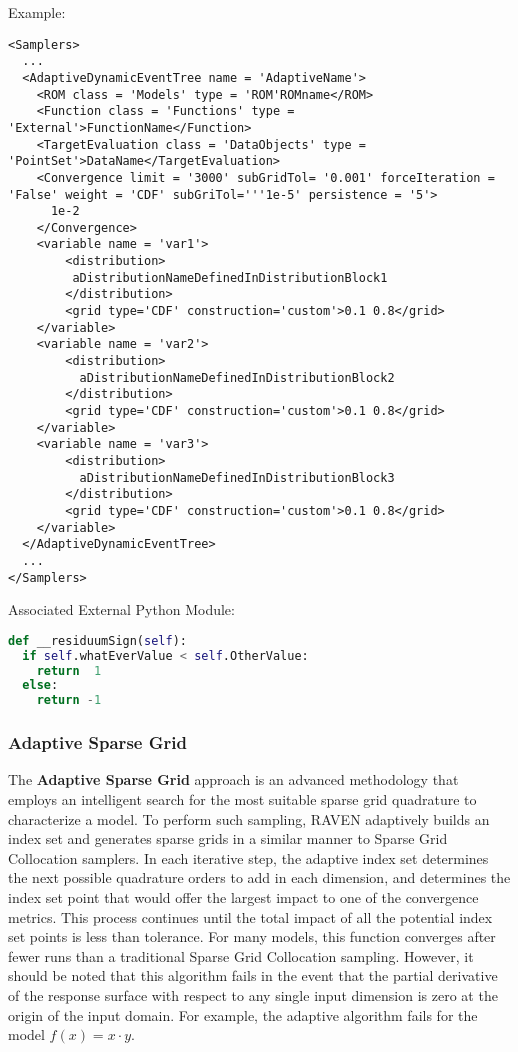 Example:
\begin{lstlisting}[style=XML]
<Samplers>
  ...
  <AdaptiveDynamicEventTree name = 'AdaptiveName'>
    <ROM class = 'Models' type = 'ROM'ROMname</ROM>
    <Function class = 'Functions' type = 'External'>FunctionName</Function>
    <TargetEvaluation class = 'DataObjects' type = 'PointSet'>DataName</TargetEvaluation>
    <Convergence limit = '3000' subGridTol= '0.001' forceIteration = 'False' weight = 'CDF' subGriTol='''1e-5' persistence = '5'>
      1e-2
    </Convergence>
    <variable name = 'var1'>
        <distribution>
         aDistributionNameDefinedInDistributionBlock1
        </distribution>
        <grid type='CDF' construction='custom'>0.1 0.8</grid>
    </variable>
    <variable name = 'var2'>
        <distribution>
          aDistributionNameDefinedInDistributionBlock2
        </distribution>
        <grid type='CDF' construction='custom'>0.1 0.8</grid>
    </variable>
    <variable name = 'var3'>
        <distribution>
          aDistributionNameDefinedInDistributionBlock3
        </distribution>
        <grid type='CDF' construction='custom'>0.1 0.8</grid>
    </variable>
  </AdaptiveDynamicEventTree>
  ...
</Samplers>
\end{lstlisting}

Associated External Python Module:
\begin{lstlisting}[language=python]
def __residuumSign(self):
  if self.whatEverValue < self.OtherValue:
    return  1
  else:
    return -1
\end{lstlisting}


\subsubsection{Adaptive Sparse Grid}
\label{subsubsubsec:AdaptiveSparseGrid}
The \textbf{Adaptive Sparse Grid} approach is an advanced methodology that employs
an intelligent search for the most suitable sparse grid quadrature to characterize a model.
%
To perform such sampling, RAVEN adaptively builds an index set and generates sparse grids
in a similar manner to Sparse Grid Collocation samplers.  In each iterative step, the adaptive
index set determines the next possible quadrature orders to add in each dimension, and
determines the index set point that would offer the largest impact to one of the convergence
metrics.  This process continues until the total impact of all the potential index set points is
less than tolerance.  For many models, this function converges after fewer runs than a traditional
Sparse Grid Collocation sampling.  However, it should be noted that this algorithm fails
in the event that the partial derivative of the response surface with respect to any single
input dimension is zero at the origin of the input domain.  For example, the adaptive
algorithm fails for the model $f(x)=x\cdot y$.
%

